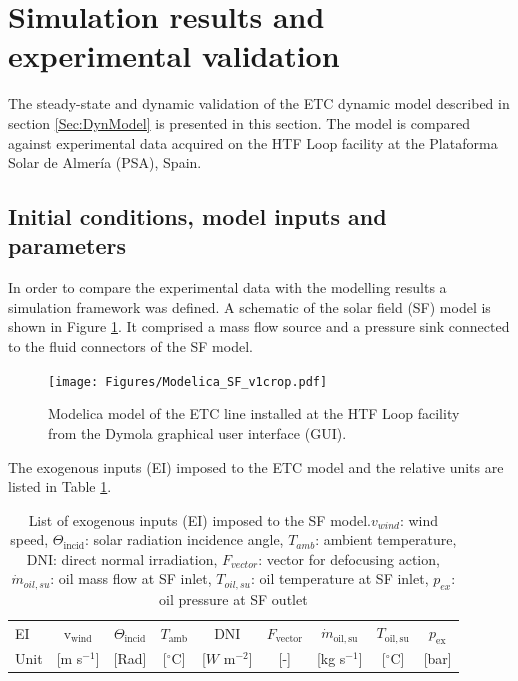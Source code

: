 \documentclass[final,3p,times,review]{elsarticle}
\begin{document}
\section{Simulation results and experimental validation}  \label{Sec:Validation}
%
The steady-state and dynamic validation of the ETC dynamic model described in section \ref{Sec:DynModel} is presented in this section. The model is compared against experimental data acquired on the HTF Loop facility at the Plataforma Solar de Almer\' ia (PSA), Spain. 
%
\subsection{Initial conditions, model inputs and parameters}
%
\label{subsec:SF_model}
In order to compare the  experimental data with the modelling results a simulation framework was defined. A schematic of the solar field (SF) model is shown in Figure \ref{fig:SF_ModModel}. It comprised a mass flow source and a pressure sink connected to the fluid connectors of the SF model. 
%
\begin{figure}[h!]
\centering
\texttt{[image: Figures/Modelica\_SF\_v1crop.pdf]}
\caption{Modelica model of the ETC line installed at the HTF Loop facility from the Dymola graphical user interface (GUI).}
\label{fig:SF_ModModel}
\end{figure}
%
The exogenous inputs (EI) imposed to the ETC model and the relative units are listed in Table \ref{Tab:SF_Inputs}. 
%
\begin{table}[h!]
\centering
\caption{List of exogenous inputs (EI) imposed to the SF model.$v_{wind}$: wind speed, $\Theta_\mathrm{incid}$: solar radiation incidence angle, $T_{amb}$: ambient temperature, DNI: direct normal irradiation, $F_{vector}$: vector for defocusing action, $\dot{m}_{oil,su}$: oil mass flow at SF inlet,  $T_{oil,su}$: oil temperature at SF inlet, $p_{ex}$: oil pressure at SF outlet}
\begin{tabular}{lcccccccc}
\toprule
EI   & v$_\mathrm{wind}$   & $\Theta_\mathrm{incid}$ & $T_\mathrm{amb}$      & DNI                & $F_\mathrm{vector}$   & $\dot{m}_\mathrm{oil,su}$ & $T_\mathrm{oil,su}$   & $p_\mathrm{ex}$ \\
Unit & [m s$^{-1}$] & [Rad]    &  [$^{\circ}$C] &  [$W$ m$^{-2}$]      & [-]            &  [kg s$^{-1}$]     &  [$^{\circ}$C] &  [bar] \\
\bottomrule
\end{tabular}
\label{Tab:SF_Inputs}
\end{table}
%
\end{document}
